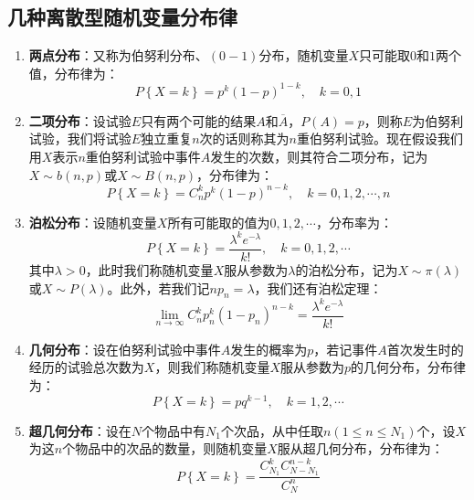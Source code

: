 \documentclass[12pt,a4paper,UTF8]{book}
\begin{document}
\subsection{几种离散型随机变量分布律}
\begin{enumerate}
\item \textbf{两点分布}：又称为伯努利分布、$(0-1)$分布，随机变量$X$只可能取$0$和$1$两个值，分布律为：
\[P\left\{X=k\right\}=p^k\left(1-p\right)^{1-k},\quad k=0,1\]
\item \textbf{二项分布}：设试验$E$只有两个可能的结果$A$和$\overline{A}$，$P\left(A\right)=p$，则称$E$为伯努利试验，我们将试验$E$独立重复$n$次的话则称其为$n$重伯努利试验。现在假设我们用$X$表示$n$重伯努利试验中事件$A$发生的次数，则其符合二项分布，记为$X\sim b\left(n,p\right)$或$X\sim B\left(n,p\right)$，分布律为：
\[P\left\{X=k\right\}=C_{n}^{k}p^k\left(1-p\right)^{n-k},\quad k=0,1,2,\cdots,n\]
\item \textbf{泊松分布}：设随机变量$X$所有可能取的值为$0,1,2,\cdots$，分布率为：
\[P\left\{X=k\right\}=\frac{\lambda^ke^{-\lambda}}{k!},\quad k=0,1,2,\cdots\]
其中$\lambda>0$，此时我们称随机变量$X$服从参数为$\lambda$的泊松分布，记为$X\sim \pi\left(\lambda\right)$或$X\sim P\left(\lambda\right)$。此外，若我们记$np_n=\lambda$，我们还有泊松定理：
\[\lim\limits_{n\to\infty}C_{n}^{k}p_n^k\left(1-p_n\right)^{n-k}=\frac{\lambda^ke^{-\lambda}}{k!}\]
\item \textbf{几何分布}：设在伯努利试验中事件$A$发生的概率为$p$，若记事件$A$首次发生时的经历的试验总次数为$X$，则我们称随机变量$X$服从参数为$p$的几何分布，分布律为：
\[P\left\{X=k\right\}=pq^{k-1},\quad k=1,2,\cdots\]
\item \textbf{超几何分布}：设在$N$个物品中有$N_1$个次品，从中任取$n(1\leq n\leq N_1)$个，设$X$为这$n$个物品中的次品的数量，则随机变量$X$服从超几何分布，分布律为：
\[P\left\{X=k\right\}=\frac{C_{N_1}^kC_{N-N_1}^{n-k}}{C_N^n}\]
\end{enumerate}
\end{document}
